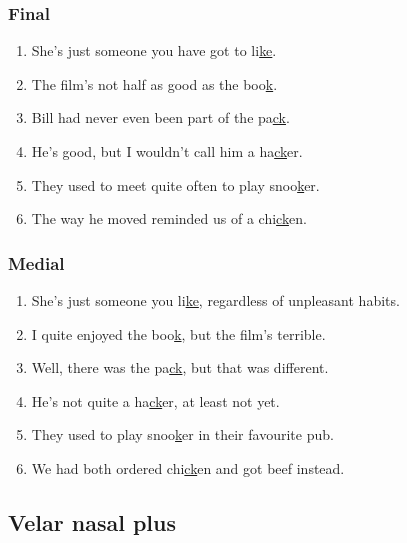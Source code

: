 	\begin{minipage}[t]{0.49\textwidth}
		\subsubsection*{Final}
			\begin{enumerate}\footnotesize
				\item She's just someone you have got to li\uline{ke}.
				\item The film's not half as good as the boo\uline{k}.
				\item Bill had never even been part of the pa\uline{ck}.
				\item He's good, but I wouldn't call him a ha\uline{ck}er.
				\item They used to meet quite often to play snoo\uline{k}er.
				\item The way he moved reminded us of a chi\uline{ck}en.
			\end{enumerate}
	\end{minipage}
	\begin{minipage}[t]{0.49\textwidth}
		\subsubsection*{Medial}
			\begin{enumerate}\footnotesize
				\item She's just someone you li\uline{ke}, regardless of unpleasant habits.
				\item I quite enjoyed the boo\uline{k}, but the film's terrible.
				\item Well, there was the pa\uline{ck}, but that was different.
				\item He's not quite a ha\uline{ck}er, at least not yet.
				\item They used to play snoo\uline{k}er in their favourite pub.
				\item We had both ordered chi\uline{ck}en and got beef instead.
			\end{enumerate}
	\end{minipage}

	\subsection*{Velar nasal plus}
	\label{sec:ng}
	
